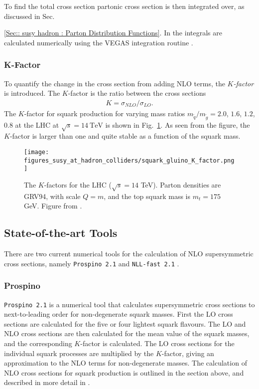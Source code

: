 \documentclass[twoside,english]{uiofysmaster}
\begin{document}
{To find the total cross section partonic cross section is then integrated over, as discussed in Sec.~{\ref{Sec:: susy hadron : Parton Distribution Functions}. In \cite{Beenakker:1996ch} the integrals are calculated numerically using the VEGAS integration routine \cite{PETERLEPAGE1978192}.


\subsubsection{K-Factor}

To quantify the change in the cross section from adding NLO terms, the \textit{$K$-factor} is introduced. The $K$-factor is the ratio between the cross sections
\begin{align}
K = \sigma_{NLO}/\sigma_{LO}.
\end{align}
The $K$-factor for squark production for varying mass ratios $m_{\widetilde{q}}/m_{\widetilde{g}}=2.0$, $ 1.6$, $1.2$, $0.8$ at the LHC at $\sqrt{s}=14~\mathrm{TeV}$ is shown in Fig.~\ref{Fig:: susy hadron : K-factor LHC}. As seen from the figure, the $K$-factor is larger than one and quite stable as a function of the squark mass. 

\begin{figure}
\centering
\texttt{[image: figures\_susy\_at\_hadron\_colliders/squark\_gluino\_K\_factor.png]}
\caption{The $K$-factors for the LHC ($\sqrt{s}=14$ TeV). Parton densities are GRV94, with scale $Q=m$, and the top squark mass is $m_t=175$ GeV. Figure from \cite{Beenakker:1996ch}.}
\label{Fig:: susy hadron : K-factor LHC}
\end{figure}


\subsection{State-of-the-art Tools}

There are two current numerical tools for the calculation of NLO supersymmetric cross sections, namely \verb|Prospino 2.1| \cite{Beenakker:1996ed} and \verb|NLL-fast 2.1| \cite{Beenakker:2015rna}.

\subsubsection{Prospino}\label{Sec:: susy hadron : Prospino}
\verb|Prospino 2.1| \cite{Beenakker:1996ed} is a numerical tool that calculates supersymmetric cross sections to next-to-leading order for non-degenerate squark masses. First the LO cross sections are calculated for the five or four lightest squark flavours. The LO and NLO cross sections are then calculated for the mean value of the squark masses, and the corresponding $K$-factor is calculated. The LO cross sections for the individual squark processes are multiplied by the $K$-factor, giving an approximation to the NLO terms for non-degenerate masses. The calculation of NLO cross sections for squark production is outlined in the section above, and described in more detail in \cite{Beenakker:1996ed}. 

}}
\end{document}
